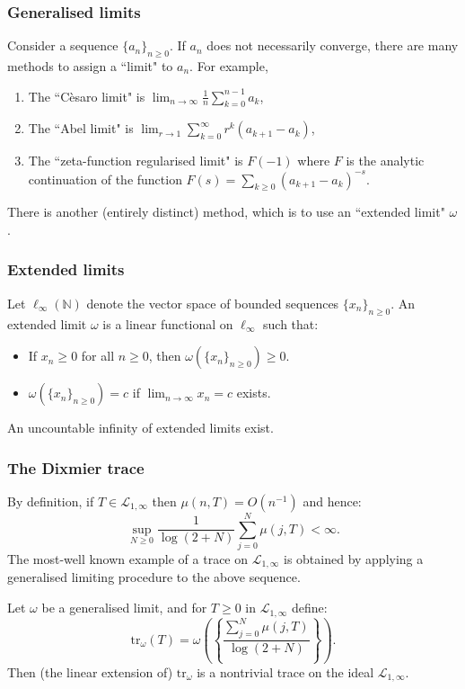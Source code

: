 \documentclass{beamer} %
\theoremstyle{definition} %
\newcommand{\Ntrl}{\mathbb{N}}
\newcommand{\Lc}{\mathcal{L}}
\newcommand{\tr}{\mathrm{tr}}
\begin{document}
\begin{frame}\frametitle{Generalised limits}
    Consider a sequence $\{a_n\}_{n\geq 0}$. If $a_n$ does not necessarily converge, there are many methods to assign a ``limit" to $a_n$. For example,
    \begin{enumerate}
        \item{} The ``C\`esaro limit" is $\lim_{n\to\infty} \frac{1}{n}\sum_{k=0}^{n-1} a_k$,
        \item{} The ``Abel limit" is $\lim_{r\to 1} \sum_{k=0}^\infty r^k (a_{k+1}-a_k)$,
        \item{} The ``zeta-function regularised limit" is $F(-1)$ where $F$ is the analytic continuation of the function $F(s) = \sum_{k\geq 0} (a_{k+1}-a_k)^{-s}$.
    \end{enumerate}
    There is another (entirely distinct) method, which is to use an ``extended limit" $\omega$.
\end{frame}

\begin{frame}\frametitle{Extended limits}
    Let $\ell_\infty(\Ntrl)$ denote the vector space of bounded sequences $\{x_n\}_{n\geq 0}$. An extended limit $\omega$ is a linear functional on $\ell_\infty$ such that:
    \begin{itemize}
        \item{} If $x_n\geq 0$ for all $n\geq 0$, then $\omega(\{x_n\}_{n\geq 0}) \geq 0$.
        \item{} $\omega(\{x_n\}_{n\geq 0}) = c$ if $\lim_{n\to\infty} x_n = c$ exists.
    \end{itemize}
    An uncountable infinity of extended limits exist.
\end{frame}

\begin{frame}\frametitle{The Dixmier trace}
    By definition, if $T \in \Lc_{1,\infty}$ then $\mu(n,T) = O(n^{-1})$ and hence:
    \begin{equation*}
        \sup_{N\geq 0}\frac{1}{\log(2+N)}\sum_{j=0}^N \mu(j,T) < \infty.
    \end{equation*}
    The most-well known example of a trace on $\Lc_{1,\infty}$ is obtained by applying a generalised limiting procedure to the above sequence.
    
    Let $\omega$ be a generalised limit, and for $T \geq 0$ in $\Lc_{1,\infty}$ define:
    \begin{equation*}
        \tr_\omega(T) = \omega\left(\left\{\frac{\sum_{j=0}^N \mu(j,T)}{\log(2+N)}\right\}\right).
    \end{equation*}
    Then (the linear extension of) $\tr_\omega$ is a nontrivial trace on the ideal $\Lc_{1,\infty}$.
\end{frame}
\end{document}
